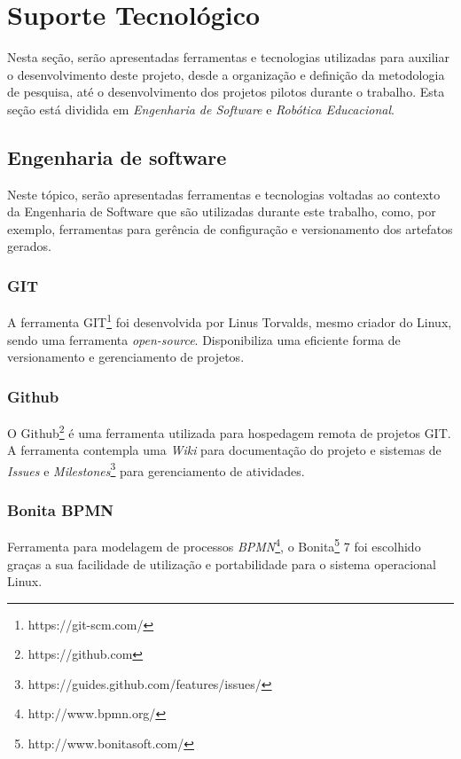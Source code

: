 
\chapter[Suporte Tecnológico]{Suporte Tecnológico}

Nesta seção, serão apresentadas ferramentas e tecnologias utilizadas para auxiliar o desenvolvimento deste projeto, desde a organização e definição da metodologia de pesquisa, até o desenvolvimento dos projetos pilotos durante o trabalho. Esta seção está dividida em \textit{Engenharia de Software} e \textit{Robótica Educacional}.

\section{Engenharia de software} %
\label{sec:engenharia_de_software}
	Neste tópico, serão apresentadas ferramentas e tecnologias voltadas ao contexto da Engenharia de Software que são utilizadas durante este trabalho, como, por exemplo, ferramentas para gerência de configuração e versionamento dos artefatos gerados.

	\subsection{GIT} %
	\label{sub:git}

		A ferramenta GIT\footnote{https://git-scm.com/} foi desenvolvida por Linus Torvalds, mesmo criador do Linux, sendo uma ferramenta \textit{open-source}. Disponibiliza uma eficiente forma de versionamento e gerenciamento de projetos.

	\subsection{Github} %
	\label{sub:github}
		O Github\footnote{https://github.com} é uma ferramenta utilizada para hospedagem remota de projetos GIT. A ferramenta contempla uma \textit{Wiki} para documentação do projeto e sistemas de \textit{Issues} e \textit{Milestones}\footnote{https://guides.github.com/features/issues/} para gerenciamento de atividades.

	\subsection{Bonita BPMN} %
	\label{sub:bonita_bpmn}
		Ferramenta para modelagem de processos \textit{BPMN}\footnote{http://www.bpmn.org/}, o Bonita\footnote{http://www.bonitasoft.com/} 7 foi escolhido graças a sua facilidade de utilização e portabilidade para o sistema operacional Linux.

